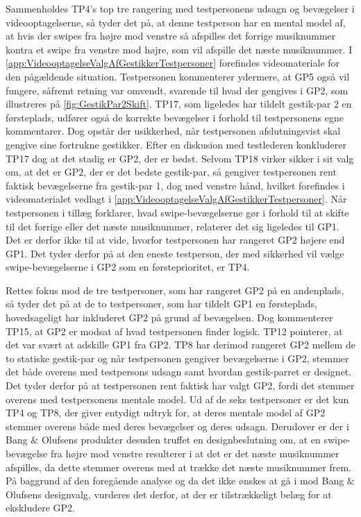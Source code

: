 \noindent
%
Sammenholdes TP4's top tre rangering med testpersonens udsagn og bevægelser i videooptagelserne, så tyder det på, at denne testperson har en mental model af, at hvis der swipes fra højre mod venstre så afspilles det forrige musiknummer kontra et swipe fra venstre mod højre, som vil afspille det næste musiknummer. I \autoref{app:VideooptagelseValgAfGestikkerTestpersoner} forefindes videomateriale for den pågældende situation. Testpersonen kommenterer ydermere, at GP5 også vil fungere, såfremt retning var omvendt, svarende til hvad der gengives i GP2, som illustreres på \autoref{fig:GestikPar2Skift}. TP17, som ligeledes har tildelt gestik-par 2 en førsteplads, udfører også de korrekte bevægelser i forhold til testpersonens egne kommentarer. Dog opstår der usikkerhed, når testpersonen afslutningsvist skal gengive sine fortrukne gestikker. Efter en diskusion med testlederen konkluderer TP17 dog at det stadig er GP2, der er bedst. Selvom TP18 virker sikker i sit valg om, at det er GP2, der er det bedste gestik-par, så gengiver testpersonen rent faktisk bevægelserne fra gestik-par 1, dog med venstre hånd, hvilket forefindes i videomaterialet vedlagt i \autoref{app:VideooptagelseValgAfGestikkerTestpersoner}. Når testpersonen i tillæg forklarer, hvad swipe-bevægelserne gør i forhold til at skifte til det forrige eller det næste musiknummer, relaterer det sig ligeledes til GP1. Det er derfor ikke til at vide, hvorfor testpersonen har rangeret GP2 højere end GP1. Det tyder derfor på at den eneste testperson, der med sikkerhed vil vælge swipe-bevægelserne i GP2 som en førsteprioritet, er TP4. 

Rettes fokus mod de tre testpersoner, som har rangeret GP2 på en andenplads, så tyder det på at de to testpersoner, som har tildelt GP1 en førsteplads, hovedsageligt har inkluderet GP2 på grund af bevægelsen. Dog kommenterer TP15, at GP2 er modsat af hvad testpersonen finder logisk. TP12 pointerer, at det var svært at adskille GP1 fra GP2. TP8 har derimod rangeret GP2 mellem de to statiske gestik-par og når testpersonen gengiver bevægelserne i GP2, stemmer det både overens med testpersons udsagn samt hvordan gestik-parret er designet. Det tyder derfor på at testpersonen rent faktisk har valgt GP2, fordi det stemmer overens med testpersonens mentale model.\blankline 
%
Ud af de seks testpersoner er det kun TP4 og TP8, der giver entydigt udtryk for, at deres mentale model af GP2 stemmer overens både med deres bevægelser og deres udsagn. Derudover er der i Bang $\&$ Olufsens produkter desuden truffet en designbeslutning om, at en swipe-bevægelse fra højre mod venstre resulterer i at det er det næste musiknummer afspilles, da dette stemmer overens med at trække det næste musiknummer frem. På baggrund af den foregående analyse og da det ikke ønskes at gå i mod Bang $\&$ Olufsens designvalg, vurderes det derfor, at der er tilstrækkeligt belæg for at ekskludere GP2. 

